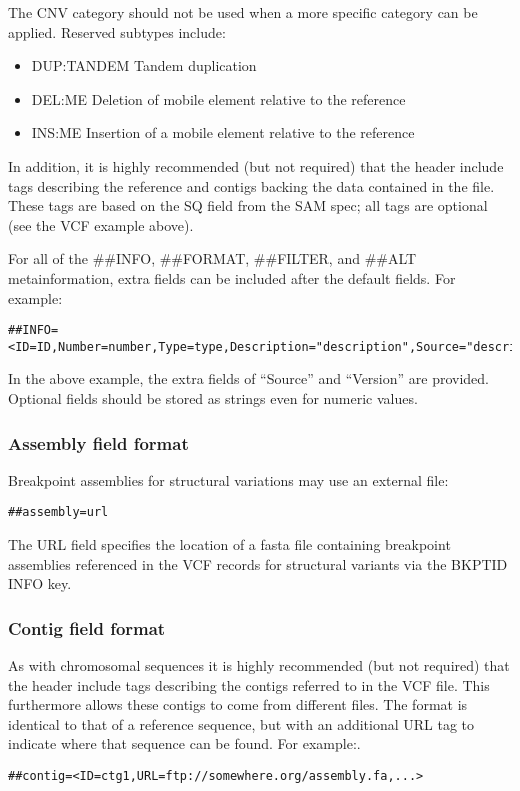 \documentclass[8pt]{article}
\begin{document}
The CNV category should not be used when a more specific category can be applied. Reserved subtypes include:
\begin{itemize}
  \item DUP:TANDEM Tandem duplication
  \item DEL:ME Deletion of mobile element relative to the reference
  \item INS:ME Insertion of a mobile element relative to the reference
\end{itemize}

In addition, it is highly recommended (but not required) that the header include tags describing the reference and contigs backing the data contained in the file.  These tags are based on the SQ field from the SAM spec; all tags are optional (see the VCF example above).

For all of the \#\#INFO, \#\#FORMAT, \#\#FILTER, and \#\#ALT metainformation, extra fields can be included after the default fields. For example:

\begin{verbatim}
##INFO=<ID=ID,Number=number,Type=type,Description="description",Source="description",Version="128">
\end{verbatim}
In the above example, the extra fields of ``Source'' and ``Version'' are provided. Optional fields should be stored as strings even for numeric values.

\subsubsection{Assembly field format}
Breakpoint assemblies for structural variations may use an external file:
\begin{verbatim}
##assembly=url
\end{verbatim}

The URL field specifies the location of a fasta file containing breakpoint assemblies referenced in the VCF records for structural variants via the BKPTID INFO key.
\subsubsection{Contig field format}
As with chromosomal sequences it is highly recommended (but not required) that the header include tags describing the contigs referred to in the VCF file. This furthermore allows these contigs to come from different files. The format is identical to that of a reference sequence, but with an additional URL tag to indicate where that sequence can be found. For example:.
\begin{verbatim}
##contig=<ID=ctg1,URL=ftp://somewhere.org/assembly.fa,...>
\end{verbatim}
\end{document}
